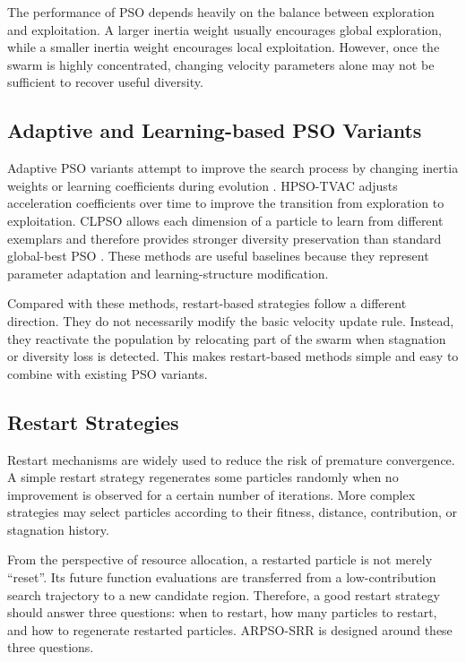 \documentclass[conference]{IEEEtran}
\begin{document}
The performance of PSO depends heavily on the balance between exploration and exploitation. A larger inertia weight usually encourages global exploration, while a smaller inertia weight encourages local exploitation. However, once the swarm is highly concentrated, changing velocity parameters alone may not be sufficient to recover useful diversity.

\subsection{Adaptive and Learning-based PSO Variants}
Adaptive PSO variants attempt to improve the search process by changing inertia weights or learning coefficients during evolution \cite{b2}. HPSO-TVAC adjusts acceleration coefficients over time to improve the transition from exploration to exploitation. CLPSO allows each dimension of a particle to learn from different exemplars and therefore provides stronger diversity preservation than standard global-best PSO \cite{b4}. These methods are useful baselines because they represent parameter adaptation and learning-structure modification.

Compared with these methods, restart-based strategies follow a different direction. They do not necessarily modify the basic velocity update rule. Instead, they reactivate the population by relocating part of the swarm when stagnation or diversity loss is detected. This makes restart-based methods simple and easy to combine with existing PSO variants.

\subsection{Restart Strategies}
Restart mechanisms are widely used to reduce the risk of premature convergence. A simple restart strategy regenerates some particles randomly when no improvement is observed for a certain number of iterations. More complex strategies may select particles according to their fitness, distance, contribution, or stagnation history.

From the perspective of resource allocation, a restarted particle is not merely ``reset''. Its future function evaluations are transferred from a low-contribution search trajectory to a new candidate region. Therefore, a good restart strategy should answer three questions: when to restart, how many particles to restart, and how to regenerate restarted particles. ARPSO-SRR is designed around these three questions.
\end{document}

